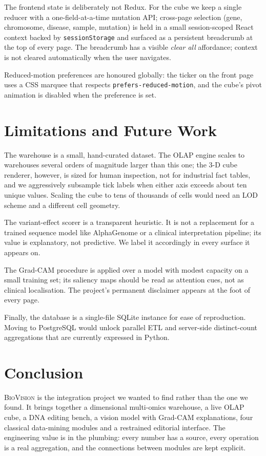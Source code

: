 \documentclass[conference,10pt]{IEEEtran}
\begin{document}
The frontend state is deliberately not Redux. For the cube we keep a
single reducer with a one-field-at-a-time mutation API; cross-page
selection (gene, chromosome, disease, sample, mutation) is held in a
small session-scoped React context backed by \texttt{sessionStorage}
and surfaced as a persistent breadcrumb at the top of every page. The
breadcrumb has a visible \textit{clear all} affordance; context is not
cleared automatically when the user navigates.

Reduced-motion preferences are honoured globally: the ticker on the
front page uses a CSS marquee that respects
\texttt{prefers-reduced-motion}, and the cube's pivot animation is
disabled when the preference is set.

\section{Limitations and Future Work}
The warehouse is a small, hand-curated dataset. The OLAP engine scales
to warehouses several orders of magnitude larger than this one; the
3-D cube renderer, however, is sized for human inspection, not for
industrial fact tables, and we aggressively subsample tick labels when
either axis exceeds about ten unique values. Scaling the cube to tens
of thousands of cells would need an LOD scheme and a different cell
geometry.

The variant-effect scorer is a transparent heuristic. It is not a
replacement for a trained sequence model like AlphaGenome
\cite{alphagenome2024} or a clinical interpretation pipeline; its
value is explanatory, not predictive. We label it accordingly in
every surface it appears on.

The Grad-CAM procedure is applied over a model with modest capacity on
a small training set; its saliency maps should be read as attention
cues, not as clinical localisation. The project's permanent
disclaimer appears at the foot of every page.

Finally, the database is a single-file SQLite instance for ease of
reproduction. Moving to PostgreSQL would unlock parallel ETL and
server-side distinct-count aggregations that are currently expressed in
Python.

\section{Conclusion}
\textsc{BioVision} is the integration project we wanted to find rather
than the one we found. It brings together a dimensional multi-omics
warehouse, a live OLAP cube, a DNA editing bench, a vision model
with Grad-CAM explanations, four classical data-mining modules and a
restrained editorial interface. The engineering value is in the
plumbing: every number has a source, every operation is a real
aggregation, and the connections between modules are kept explicit.
\end{document}

